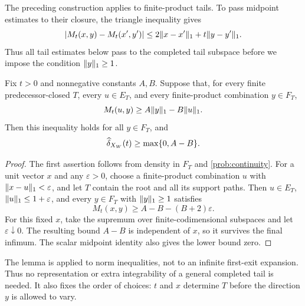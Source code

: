 The preceding construction applies to finite-product tails. To pass
midpoint estimates to their closure, the triangle inequality gives
\begin{equation}\label{prob:continuity}
 |M_t(x,y)-M_t(x',y')|
 \le2\lVert x-x'\rVert_1+t\lVert y-y'\rVert_1.
\end{equation}
Thus all tail estimates below pass to the completed tail subspace before
we impose the condition $\lVert y\rVert_1\ge1$.


\begin{lemma}\label{lem:affine}
Fix $t>0$ and nonnegative constants $A,B$. Suppose that, for every finite
predecessor-closed $T$, every $u\in E_T$, and every finite-product
combination $y\in F_T$,
\[
 M_t(u,y)\ge A\lVert y\rVert_1-B\lVert u\rVert_1.
\]
Then this inequality holds for all $y\in F_T$, and
\[
 \widehat\delta_{X_W}(t)\ge\max\{0,A-B\}.
\]
\end{lemma}
\begin{proof}
The first assertion follows from density in $F_T$ and
\eqref{prob:continuity}. For a unit vector $x$ and any $\varepsilon>0$,
choose a finite-product combination $u$ with $\lVert x-u\rVert_1<\varepsilon$,
and let $T$ contain the root and all its support paths. Then $u\in E_T$,
$\lVert u\rVert_1\le1+\varepsilon$, and every $y\in F_T$ with $\lVert y\rVert_1\ge1$
satisfies
\[
 M_t(x,y)\ge A-B-(B+2)\varepsilon.
\]
For this fixed $x$, take the supremum over finite-codimensional subspaces
and let $\varepsilon\downarrow0$. The resulting bound $A-B$ is independent
of $x$, so it survives the final infimum. The scalar midpoint identity
also gives the lower bound zero.
\end{proof}

The lemma is applied to norm inequalities, not to an infinite first-exit
expansion. Thus no representation or extra integrability of a general
completed tail is needed. It also fixes the order of choices: $t$ and
$x$ determine $T$ before the direction $y$ is allowed to vary.
